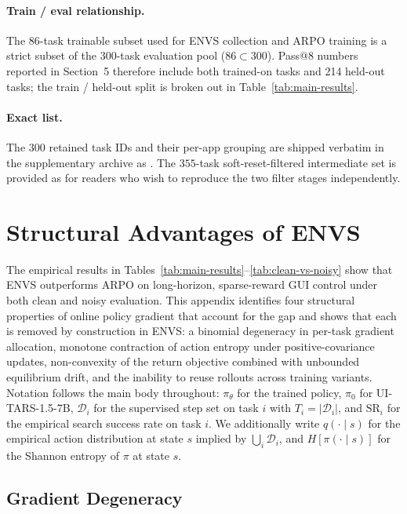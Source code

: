 \documentclass[11pt]{article}
\begin{document}
\paragraph{Train / eval relationship.}
The 86-task trainable subset used for ENVS collection and ARPO training
is a strict subset of the 300-task evaluation pool ($86 \subset 300$).
Pass@8 numbers reported in Section~5 therefore include both trained-on
tasks and 214 held-out tasks; the train / held-out split is broken out
in Table~\ref{tab:main-results}.

\paragraph{Exact list.}
The $300$ retained task IDs and their per-app grouping are shipped
verbatim in the supplementary archive as
.
The $355$-task soft-reset-filtered intermediate set is provided as
 for readers who wish to
reproduce the two filter stages independently.

\section{Structural Advantages of \textsc{ENVS}}
\label{app:envs-vs-rl}

The empirical results in Tables~\ref{tab:main-results}--\ref{tab:clean-vs-noisy}
show that \textsc{ENVS} outperforms ARPO on long-horizon, sparse-reward
GUI control under both clean and noisy evaluation. This appendix
identifies four structural properties of online policy gradient that
account for the gap and shows that each is removed by construction in
\textsc{ENVS}: a binomial degeneracy in per-task gradient allocation,
monotone contraction of action entropy under positive-covariance updates,
non-convexity of the return objective combined with unbounded equilibrium
drift, and the inability to reuse rollouts across training variants.
Notation follows the main body throughout: $\pi_\theta$ for the trained
policy, $\pi_0$ for UI-TARS-1.5-7B, $\mathcal{D}_i$ for the supervised
step set on task $i$ with $T_i = |\mathcal{D}_i|$, and $\mathrm{SR}_i$
for the empirical search success rate on task $i$. We additionally write
$q(\cdot \mid s)$ for the empirical action distribution at state $s$
implied by $\bigcup_i \mathcal{D}_i$, and $H[\pi(\cdot \mid s)]$ for the
Shannon entropy of $\pi$ at state $s$.

\subsection{Gradient Degeneracy}
\label{app:rl:gradient}
\end{document}

